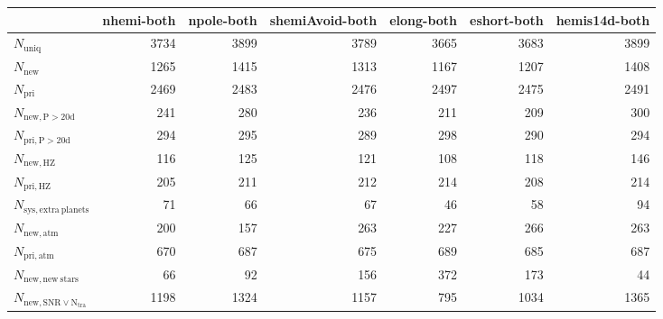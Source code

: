 \begin{tabular}{lrrrrrr}
\toprule
{} &  nhemi-both &  npole-both &  shemiAvoid-both &  elong-both &  eshort-both &  hemis14d-both \\
\midrule
$N_{\mathrm{uniq}}$                &        3734 &        3899 &             3789 &        3665 &         3683 &           3899 \\
$N_{\mathrm{new}}$                 &        1265 &        1415 &             1313 &        1167 &         1207 &           1408 \\
$N_{\mathrm{pri}}$                 &        2469 &        2483 &             2476 &        2497 &         2475 &           2491 \\
$N_{\mathrm{new,P>20d}}$           &         241 &         280 &              236 &         211 &          209 &            300 \\
$N_{\mathrm{pri,P>20d}}$           &         294 &         295 &              289 &         298 &          290 &            294 \\
$N_{\mathrm{new,HZ}}$              &         116 &         125 &              121 &         108 &          118 &            146 \\
$N_{\mathrm{pri,HZ}}$              &         205 &         211 &              212 &         214 &          208 &            214 \\
$N_{\mathrm{sys,extra\ planets}}$  &          71 &          66 &               67 &          46 &           58 &             94 \\
$N_{\mathrm{new,atm}}$             &         200 &         157 &              263 &         227 &          266 &            263 \\
$N_{\mathrm{pri,atm}}$             &         670 &         687 &              675 &         689 &          685 &            687 \\
$N_{\mathrm{new,new\ stars}}$      &          66 &          92 &              156 &         372 &          173 &             44 \\
$N_{\mathrm{new,SNR\lor N_{tra}}}$ &        1198 &        1324 &             1157 &         795 &         1034 &           1365 \\
\bottomrule
\end{tabular}

